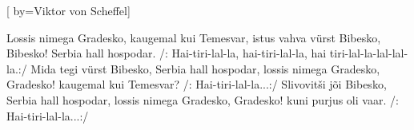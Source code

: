
[
	by={Viktor von Scheffel}]
  
\beginverse*
Lossis nimega Gradesko,
kaugemal kui Temesvar,
istus vahva vürst Bibesko, Bibesko!
Serbia hall hospodar. 
\endverse
\beginchorus
/: Hai-tiri-lal-la, hai-tiri-lal-la, 
hai tiri-lal-la-lal-lal-la.:/ 
\endchorus
\beginverse*
Mida tegi vürst Bibesko,
Serbia hall hospodar,
lossis nimega Gradesko, Gradesko!
kaugemal kui Temesvar?
\endverse
\beginchorus
/: Hai-tiri-lal-la...:/ 
\endchorus
\beginverse*
Slivovitši jõi Bibesko,
Serbia hall hospodar,
lossis nimega Gradesko, Gradesko!
kuni purjus oli vaar.
\endverse
\beginchorus
/: Hai-tiri-lal-la...:/ 
\endchorus
\endsong
